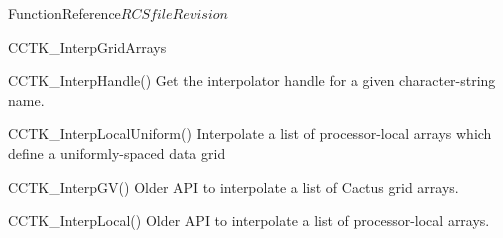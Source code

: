 \begin{cactuspart}{FunctionReference}{$RCSfile$}{$Revision$}
\begin{FunctionDescription}{CCTK\_InterpGridArrays}
\begin{SeeAlsoSection}
\begin{SeeAlso}{CCTK\_InterpHandle()}
Get the interpolator handle for a given character-string name.
\end{SeeAlso}
\begin{SeeAlso}{CCTK\_InterpLocalUniform()}
Interpolate a list of processor-local arrays
which define a uniformly-spaced data grid
\end{SeeAlso}
\begin{SeeAlso}{CCTK\_InterpGV()}
Older API to interpolate a list of Cactus grid arrays.
\end{SeeAlso}
\begin{SeeAlso}{CCTK\_InterpLocal()}
Older API to interpolate a list of processor-local arrays.
\end{SeeAlso}
\end{SeeAlsoSection}


\end{FunctionDescription}
\end{cactuspart}
